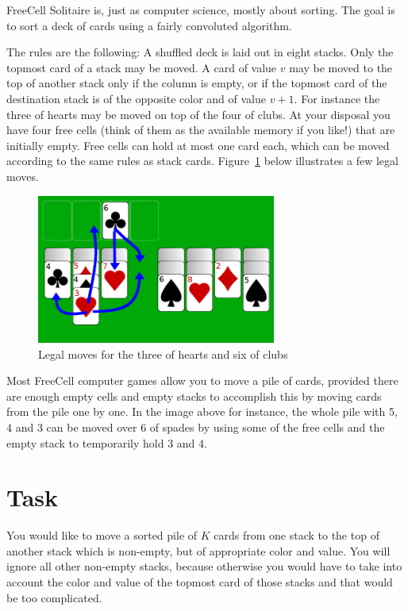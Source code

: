 
FreeCell Solitaire is, just as computer science, mostly about sorting. The goal is to sort a deck of
cards using a fairly convoluted algorithm.

The rules are the following: A shuffled deck is laid out in eight stacks. Only the topmost card of a stack may be moved. A card of value $v$ may be moved to the top of another stack only if the column is empty, or if the topmost card of the destination stack is of the opposite color and of value $v+1$.  For instance the three of hearts may be moved on top of the four of clubs. At your disposal you have four free cells (think of them as the available memory if you like!) that are initially empty. Free cells can hold at most one card each, which can be moved according to the same rules as stack cards. Figure~\ref{fig:freecell moves} below illustrates a few legal moves.

\begin{figure}[h]
  \begin{center}
    \includegraphics[width=0.7\textwidth]{freecell}
    \caption{Legal moves for the three of hearts and six of clubs}
    \label{fig:freecell moves}
  \end{center}
\end{figure}

Most FreeCell computer games allow you to move a pile of cards, provided there are enough empty
cells and empty stacks to accomplish this by moving cards from the pile one by one. In the image
above for instance, the whole pile with 5, 4 and 3 can be moved over 6 of spades by using some of
the free cells and the empty stack to temporarily hold 3 and 4.

\section*{Task}

You would like to move a sorted pile of $K$ cards from one stack to the top of another stack which
is non-empty, but of appropriate color and value. You will ignore all other non-empty stacks,
because otherwise you would have to take into account the color and value of the topmost card of those
stacks and that would be too complicated.

